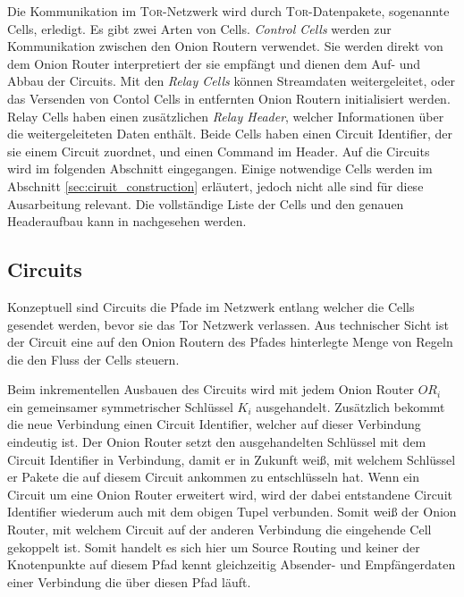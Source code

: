 \documentclass[fleqn,envcountsame,runningheads,10pt,a4paper]{llncs}
\begin{document}
Die Kommunikation im \textsc{Tor}-Netzwerk wird durch \textsc{Tor}-Datenpakete, sogenannte Cells, erledigt. Es gibt zwei Arten von Cells. \textit{Control Cells} werden zur Kommunikation zwischen den Onion Routern verwendet. Sie werden direkt von dem Onion Router interpretiert der sie empfängt und dienen dem Auf- und Abbau der Circuits. Mit den \textit{Relay Cells} können Streamdaten weitergeleitet, oder das Versenden von Contol Cells in entfernten Onion Routern initialisiert werden. Relay Cells haben einen zusätzlichen \textit{Relay Header}, welcher Informationen über die weitergeleiteten Daten enthält. Beide Cells haben einen Circuit Identifier, der sie einem Circuit zuordnet, und einen Command im Header. Auf die Circuits wird im folgenden Abschnitt eingegangen. Einige notwendige Cells werden im Abschnitt \ref{sec:ciruit_construction} erläutert, jedoch nicht alle sind für diese Ausarbeitung relevant. Die vollständige Liste der Cells und den genauen Headeraufbau kann in \cite{tor} nachgesehen werden.

\subsection{Circuits}

Konzeptuell sind Circuits die Pfade im Netzwerk entlang welcher die Cells gesendet werden, bevor sie das Tor Netzwerk verlassen. Aus technischer Sicht ist der Circuit eine auf den Onion Routern des Pfades hinterlegte Menge von Regeln die den Fluss der Cells steuern.

\newpage Beim inkrementellen Ausbauen des Circuits wird mit jedem Onion Router $\textit{OR}_i$ ein gemeinsamer symmetrischer Schlüssel $\textit{K}_i$ ausgehandelt. Zusätzlich bekommt die neue Verbindung einen Circuit Identifier, welcher auf dieser Verbindung eindeutig ist. Der Onion Router setzt den ausgehandelten Schlüssel mit dem Circuit Identifier in Verbindung, damit er in Zukunft weiß, mit welchem Schlüssel er Pakete die auf diesem Circuit ankommen zu entschlüsseln hat. Wenn ein Circuit um eine Onion Router erweitert wird, wird der dabei entstandene Circuit Identifier wiederum auch mit dem obigen Tupel verbunden. Somit weiß der Onion Router, mit welchem Circuit auf der anderen Verbindung die eingehende Cell gekoppelt ist. Somit handelt es sich hier um Source Routing und keiner der Knotenpunkte auf diesem Pfad kennt gleichzeitig Absender- und Empfängerdaten einer Verbindung die über diesen Pfad läuft. 
\end{document}
